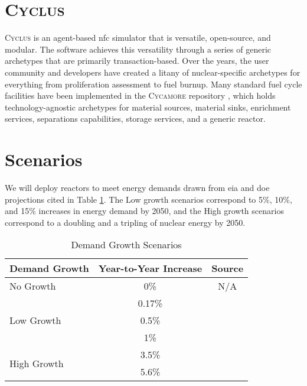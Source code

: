 \documentclass{anstrans}
\newcommand{\cycamore}{\textsc{Cycamore}\xspace}
\newcommand{\cyclus}{\textsc{Cyclus}\xspace}
\begin{document}
\section{\cyclus}

\cyclus \cite{huff_cyclus_intro_2016} is an agent-based \gls{nfc} simulator
that is versatile, open-source, and modular. The software achieves this
versatility through a series of generic archetypes that are primarily
transaction-based. Over the years, the user community and developers have
created a litany of nuclear-specific archetypes for everything from
proliferation assessment to fuel burnup. Many standard fuel cycle facilities
have been implemented in the \cycamore repository \cite{Carlsen_cycamore_2014},
which holds technology-agnostic archetypes for material sources, material
sinks, enrichment services, separations capabilities, storage services, and a
generic reactor.


\section{Scenarios}
We will deploy reactors to meet energy demands drawn from \gls{eia} and \gls{doe} projections cited in Table \ref{tab:demand_scenarios}. The Low growth scenarios correspond to 5\%, 10\%, and 15\% increases in energy demand by 2050, and the High growth scenarios correspond to a doubling and a tripling of nuclear energy by 2050.

\begin{table}[h]
  \centering
  \caption{Demand Growth Scenarios}
  \label{tab:demand_scenarios}
  \begin{tabular}{l c c}
      \hline
      \textbf{Demand Growth} & \textbf{Year-to-Year Increase} & \textbf{Source}\\
      \hline
      No Growth & 0\% & N/A\\
      \multirow{3}{*}{Low Growth} & 0.17\% & \cite{eia_aeo_2023}\\
       & 0.5\% & \cite{eia_aeo_2023}\\
       & 1\% & \cite{eia_aeo_2023}\\
       \multirow{2}{*}{High Growth} & 3.5\% & \cite{julie_liftoff_pathways_2024} \\
       & 5.6\% & \cite{julie_liftoff_pathways_2024}\\
      \hline
  \end{tabular}
\end{table}
\end{document}
